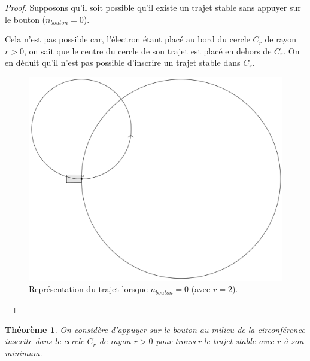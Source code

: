 \documentclass{amsart}
\newtheorem{theorem}{Théorème}[section]
\theoremstyle{definition}
\theoremstyle{remark}
\numberwithin{equation}{section}
\begin{document}
\begin{proof}
  Supposons qu'il soit possible qu'il existe un trajet stable sans appuyer sur le bouton ($n_{bouton}=0$).

  Cela n'est pas possible car, l'électron étant placé au bord du cercle $C_r$ de rayon $r>0$, on sait que le centre du cercle de son trajet est placé en dehors de $C_r$. On en déduit qu'il n'est pas possible
  d'inscrire un trajet stable dans $C_r$.

  \begin{figure}[H]
    \centering
    \includegraphics[scale=0.15]{images/not_possible.png}
    \caption{Représentation du trajet lorsque $n_{bouton}=0$ (avec $r=2$).}
  \end{figure}
\end{proof}

\begin{theorem}
  On considère d'appuyer sur le bouton au milieu de la circonférence inscrite dans le cercle $C_r$ de rayon $r>0$ pour trouver le trajet stable avec $r$ à son minimum.
\end{theorem}
\end{document}
